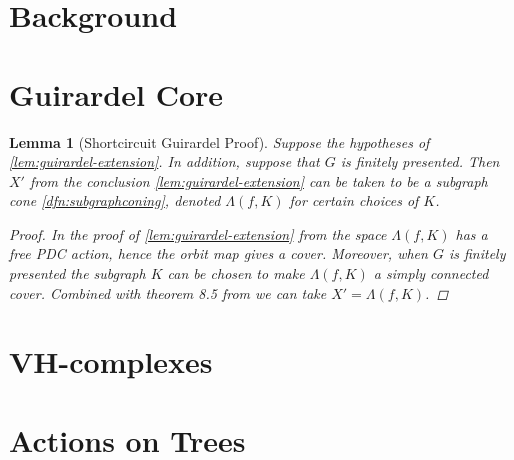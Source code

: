 \documentclass[12pt,parskip=full]{report}
\theoremstyle{plain}
\newtheorem{lem}[thm]{Lemma}
\theoremstyle{definition}
\begin{document}
\section{Background}

\section{Guirardel Core}

\begin{lem}
    [Shortcircuit Guirardel Proof] 
    \label{lem:shortcircuit} Suppose the hypotheses of \ref{lem:guirardel-extension}. In addition, suppose that $G$ is finitely presented. Then \(X'\) from the conclusion \ref{lem:guirardel-extension} can be taken to be a subgraph cone \ref{dfn:subgraphconing}, denoted \(\Lambda(f,K)\) for certain choices of \(K\).
    \begin{proof}
        In the proof of \ref{lem:guirardel-extension} from \cite{guirardelcorepaper} the space \(\Lambda(f,K)\) has a free PDC action, hence the orbit map gives a cover. Moreover, when \(G\) is finitely presented the subgraph \(K\) can be chosen to make \(\Lambda(f,K)\) a simply connected cover. Combined with theorem 8.5 from \cite{guirardelcorepaper} we can take \(X' = \Lambda(f,K)\).
    \end{proof}

\end{lem}

\section{VH-complexes}



\section{Actions on Trees}



\end{document}
